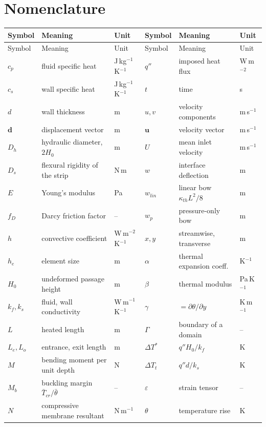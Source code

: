 \documentclass[11pt,a4paper]{article}
\newcommand{\bu}{\mathbf u}
\newcommand{\bd}{\mathbf d}
\newcommand{\eps}{\varepsilon}
\newcommand{\Ga}{\Gamma}
\begin{document}
\section*{Nomenclature}
\small
\begin{longtable}{@{}l l l@{\hspace{8mm}}l l l@{}}
\toprule
Symbol & Meaning & Unit & Symbol & Meaning & Unit\\
\midrule
\endfirsthead
\toprule
Symbol & Meaning & Unit & Symbol & Meaning & Unit\\
\midrule
\endhead
$c_p$ & fluid specific heat & J\,kg$^{-1}$K$^{-1}$ & $q''$ & imposed heat flux & W\,m$^{-2}$\\
$c_s$ & wall specific heat & J\,kg$^{-1}$K$^{-1}$ & $t$ & time & s\\
$d$ & wall thickness & m & $u,v$ & velocity components & m\,s$^{-1}$\\
$\bd$ & displacement vector & m & $\bu$ & velocity vector & m\,s$^{-1}$\\
$D_h$ & hydraulic diameter, $2H_0$ & m & $U$ & mean inlet velocity & m\,s$^{-1}$\\
$D_s$ & flexural rigidity of the strip & N\,m & $w$ & interface deflection & m\\
$E$ & Young's modulus & Pa & $w_{lin}$ & linear bow $\kappa_{th}L^2/8$ & m\\
$f_D$ & Darcy friction factor & -- & $w_p$ & pressure-only bow & m\\
$h$ & convective coefficient & W\,m$^{-2}$K$^{-1}$ & $x,y$ & streamwise, transverse & m\\
$h_e$ & element size & m & $\alpha$ & thermal expansion coeff. & K$^{-1}$\\
$H_0$ & undeformed passage height & m & $\beta$ & thermal modulus & Pa\,K$^{-1}$\\
$k_f,k_s$ & fluid, wall conductivity & W\,m$^{-1}$K$^{-1}$ & $\gamma$ & $=\partial\theta/\partial y$ & K\,m$^{-1}$\\
$L$ & heated length & m & $\Ga$ & boundary of a domain & --\\
$L_e,L_o$ & entrance, exit length & m & $\Delta T^{*}$ & $q''H_0/k_f$ & K\\
$M$ & bending moment per unit depth & N & $\Delta T_t$ & $q''d/k_s$ & K\\
$M_b$ & buckling margin $\bar T_{cr}/\bar\theta$ & -- & $\eps$ & strain tensor & --\\
$N$ & compressive membrane resultant & N\,m$^{-1}$ & $\theta$ & temperature rise & K\\

\end{longtable}
\end{document}
